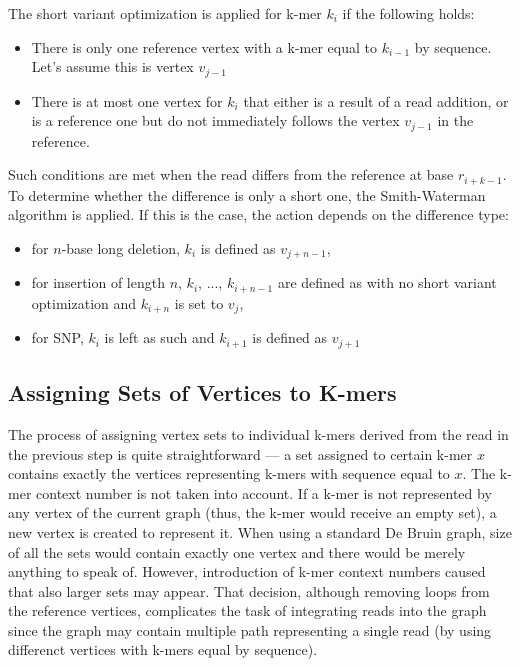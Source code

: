The short variant optimization is applied for k-mer $k_i$ if the following holds:
\begin{itemize}
\item There is only one reference vertex with a k-mer equal to $k_{i-1}$ by sequence. Let's assume this is vertex $v_{j-1}$
\item There is at most one vertex for $k_i$ that either is a result of a read addition, or is a reference one but do not immediately follows  the vertex $v_{j-1}$ in the reference.
\end{itemize}
Such conditions are met when the read differs from the reference at base $r_{i+k-1}$. To determine whether the difference is only a short one, the Smith-Waterman algorithm is applied. If this is the case, the action depends on the difference type:
\begin{itemize}
\item for $n$-base long deletion, $k_i$ is defined as $v_{j + n - 1}$,
\item for insertion of length $n$, $k_i$, ..., $k_{i + n - 1}$ are defined as with no short variant optimization and $k_{i + n}$ is set to $v_j$,
\item for SNP, $k_i$ is left as such and $k_{i+1}$ is defined as $v_{j+1}$
\end{itemize}

\subsection{Assigning Sets of Vertices to K-mers}
\label{subsec:assign-sets}

The process of assigning vertex sets to individual k-mers derived from the read in the previous step is quite straightforward --- a set assigned to certain k-mer $x$ contains exactly the vertices representing k-mers with sequence equal to $x$. The k-mer context number is not taken into account. If a k-mer is not represented by any vertex of the current graph (thus, the k-mer would receive an empty set), a new vertex is created to represent it. When using a standard De Bruin graph, size of all the sets would contain exactly one vertex and there would be merely anything to speak of. However, introduction of k-mer context numbers caused that also larger sets may appear. That decision, although removing loops from the reference vertices, complicates the task of integrating reads into the graph since the graph may contain multiple path representing a single read (by using differenct vertices with k-mers equal by sequence).

